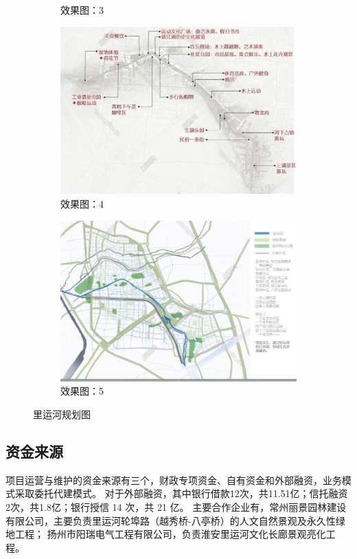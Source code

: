 \documentclass[H:\workspace\担保人财务信息2\杭州大运河\HangZhouText.tex]{subfiles}
\begin{document}
\begin{figure}[H]
\begin{subfigure}[b]{0.4\textwidth}
        \caption{效果图：3}
        \label{fig:3}
    \end{subfigure}
    \hfill 
    \begin{subfigure}[b]{0.4\textwidth}
        \includegraphics[width=\textwidth]{img11.png}
        \caption{效果图：4}
        \label{fig:4}
    \end{subfigure}
    \hfill 
    \begin{subfigure}{0.4\textwidth}
        \includegraphics[width=\textwidth]{img12.png}
        \caption{效果图：5}
        \label{fig:5}
    \end{subfigure}

    \caption{里运河规划图}
    \label{fig:figure}
\end{figure}

\subsection{资金来源}
项目运营与维护的资金来源有三个，财政专项资金、自有资金和外部融资，业务模式采取委托代建模式。
对于外部融资，其中银行借款12次，共11.51亿；信托融资2次，共1.8亿；银行授信 14 次，共 21 亿。
主要合作企业有，常州丽景园林建设有限公司，主要负责里运河轮埠路（越秀桥-八亭桥）的人文自然景观及永久性绿地工程；
扬州市阳瑞电气工程有限公司，负责淮安里运河文化长廊景观亮化工程。
\end{document}
